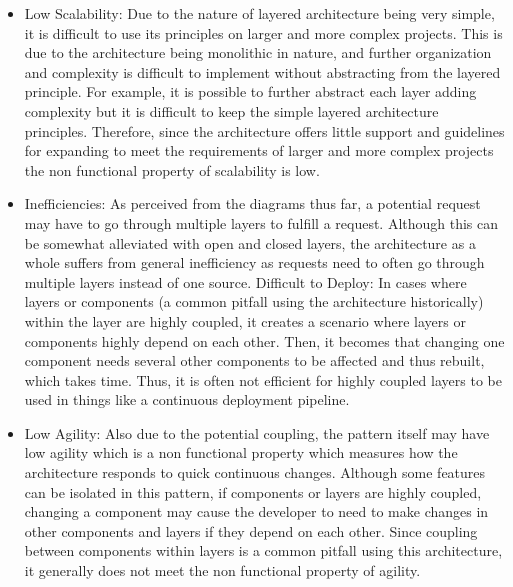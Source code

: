 {\begin{itemize}
\end{itemize}
}{\begin{itemize}
        \item Low Scalability: Due to the nature of layered architecture being
            very simple, it is difficult to use its principles on larger and
            more complex projects. This is due to the architecture being
            monolithic in nature, and further organization and complexity is
            difficult to implement without abstracting from the layered
            principle. For example, it is possible to further abstract each
            layer adding complexity but it is difficult to keep the simple
            layered architecture principles. Therefore, since the architecture
            offers little support and guidelines for expanding to meet the
            requirements of larger and more complex projects the non functional
            property of scalability is low.

        \item Inefficiencies: As perceived from the diagrams thus far, a
            potential request may have to go through multiple layers to fulfill
            a request. Although this can be somewhat alleviated with open and
            closed layers, the architecture as a whole suffers from general
            inefficiency as requests need to often go through multiple layers
            instead of one source. Difficult to Deploy: In cases where layers
            or components (a common pitfall using the architecture
            historically) within the layer are highly coupled, it creates a
            scenario where layers or components highly depend on each other.
            Then, it becomes that changing one component needs several other
            components to be affected and thus rebuilt, which takes time. Thus,
            it is often not efficient for highly coupled layers to be used in
            things like a continuous deployment pipeline.
            
        \item Low Agility: Also due to the potential coupling, the pattern
            itself may have low agility which is a non functional property
            which measures how the architecture responds to quick continuous
            changes. Although some features can be isolated in this pattern, if
            components or layers are highly coupled, changing a component may
            cause the developer to need to make changes in other components and
            layers if they depend on each other. Since coupling between
            components within layers is a common pitfall using this
            architecture, it generally does not meet the non functional
            property of agility.
\end{itemize}}

